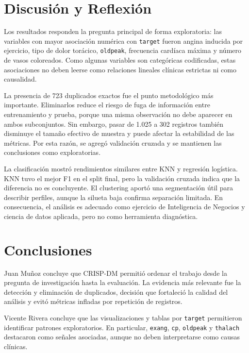 \documentclass[10pt,a4paper]{article}
\begin{document}
\section{Discusión y Reflexión}

Los resultados responden la pregunta principal de forma exploratoria: las variables con mayor asociación numérica con \texttt{target} fueron angina inducida por ejercicio, tipo de dolor torácico, \texttt{oldpeak}, frecuencia cardíaca máxima y número de vasos coloreados. Como algunas variables son categóricas codificadas, estas asociaciones no deben leerse como relaciones lineales clínicas estrictas ni como causalidad.

La presencia de 723 duplicados exactos fue el punto metodológico más importante. Eliminarlos reduce el riesgo de fuga de información entre entrenamiento y prueba, porque una misma observación no debe aparecer en ambos subconjuntos. Sin embargo, pasar de 1.025 a 302 registros también disminuye el tamaño efectivo de muestra y puede afectar la estabilidad de las métricas. Por esta razón, se agregó validación cruzada y se mantienen las conclusiones como exploratorias.

La clasificación mostró rendimientos similares entre KNN y regresión logística. KNN tuvo el mejor F1 en el split final, pero la validación cruzada indica que la diferencia no es concluyente. El clustering aportó una segmentación útil para describir perfiles, aunque la silueta baja confirma separación limitada. En consecuencia, el análisis es adecuado como ejercicio de Inteligencia de Negocios y ciencia de datos aplicada, pero no como herramienta diagnóstica.

\section{Conclusiones}

Juan Muñoz concluye que CRISP-DM permitió ordenar el trabajo desde la pregunta de investigación hasta la evaluación. La evidencia más relevante fue la detección y eliminación de duplicados, decisión que fortaleció la calidad del análisis y evitó métricas infladas por repetición de registros.

Vicente Rivera concluye que las visualizaciones y tablas por \texttt{target} permitieron identificar patrones exploratorios. En particular, \texttt{exang}, \texttt{cp}, \texttt{oldpeak} y \texttt{thalach} destacaron como señales asociadas, aunque no deben interpretarse como causas clínicas.
\end{document}
